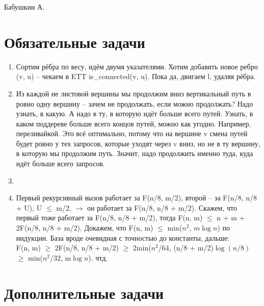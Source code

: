 \documentclass[12pt]{article}
\begin{document}
\def\t{\texttt}

Бабушкин А.

\section{Обязательные задачи}

\begin{enumerate}
	\setlength{\parskip}{0pt} 
	\setlength{\itemsep}{0pt} 
	\item Сортим рёбра по весу, идём двумя указателями. Хотим добавить новое ребро (v, u) -- чекаем в ETT is\_connected(v, u). Пока да, двигаем l, 
    удаляя рёбра. \\
    \item Из каждой не листовой вершины мы продолжим вниз вертикальный путь в ровно одну вершину -- зачем не продолжать, если можно продолжать? Надо узнать, в 
    какую. А надо в ту, в которую идёт больше всего путей. Узнать, в каком поддереве больше всего концов путей, можно как угодно. Например, переливайкой. Это всё 
    оптимально, потому что на вершине v смена путей будет ровно у тех запросов, которые уходят через v вниз, но не в ту вершину, в которую мы продолжим путь. Значит, 
    надо продолжить именно туда, куда идёт больше всего запросов. \\
    \item ~\\
    \item Первый рекурсивный вызов работает за F(n/8, m/2), второй -- за F(n/8, n/8 + U), U $\le$ m/2, $\to$ он работает за F(n/8, n/8 + m/2). Скажем, что первый тоже работает 
    за F(n/8, n/8 + m/2), тогда F(n, m) $\le$ n + m + 2F(n/8, n/8 + m/2). Докажем, что F(n, m) $\le$ min($n^2$, $m\log n$) по индукции. База вроде очевидная с точностью до константы, дальше: \\
    F(n, m) $\ge$ 2F(n/8, n/8 + m/2) $\ge$ 2min($n^2$/64, (n/8 + m/2)$\log(n/8)$ $\ge$ min($n^2$/32, m$\log n$). чтд. \\
\end{enumerate}

\section{Дополнительные задачи}
\end{document}
